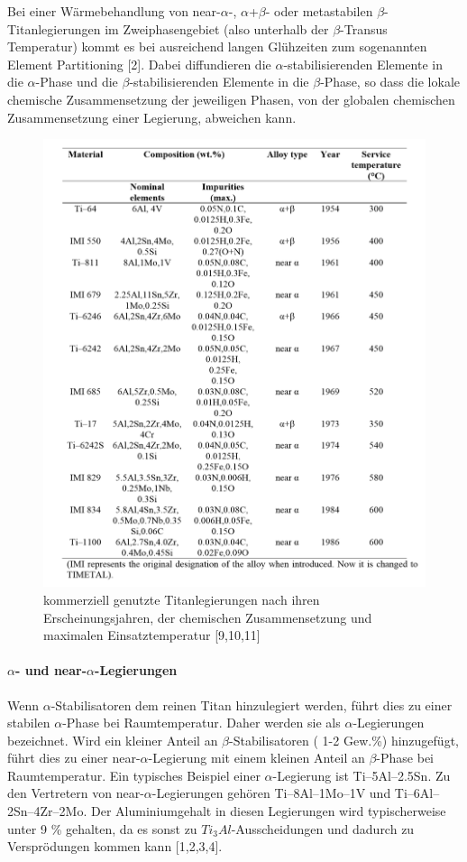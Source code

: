 Bei einer Wärmebehandlung von near-$\alpha$-, $\alpha$+$\beta$- oder metastabilen $\beta$-Titanlegierungen im Zweiphasengebiet (also unterhalb der $\beta$-Transus Temperatur) kommt es bei ausreichend langen Glühzeiten zum sogenannten Element Partitioning [2]. Dabei diffundieren die $\alpha$-stabilisierenden Elemente in die $\alpha$-Phase und die $\beta$-stabilisierenden Elemente in die $\beta$-Phase, so dass die lokale chemische Zusammensetzung der jeweiligen Phasen, von der globalen chemischen Zusammensetzung einer Legierung, abweichen kann.

\begin{figure}[h]
	\centering
	\includegraphics[width=0.8\linewidth]{"Bilder/Tabelle 2"}
	\caption[Tabelle 2]{kommerziell genutzte Titanlegierungen nach ihren Erscheinungsjahren, der chemischen Zusammensetzung und maximalen Einsatztemperatur [9,10,11]}
	\label{fig:tabelle-2}
\end{figure}

\paragraph{$\alpha$- und near-$\alpha$-Legierungen}
Wenn $\alpha$-Stabilisatoren dem reinen Titan hinzulegiert werden, führt dies zu einer stabilen $\alpha$-Phase bei Raumtemperatur. Daher werden sie als $\alpha$-Legierungen bezeichnet. Wird ein kleiner Anteil an $\beta$-Stabilisatoren ( 1-2 Gew.\%) hinzugefügt, führt dies zu einer near-$\alpha$-Legierung mit einem kleinen Anteil an $\beta$-Phase bei Raumtemperatur. Ein typisches Beispiel einer $\alpha$-Legierung ist Ti–5Al–2.5Sn. Zu den Vertretern von near-$\alpha$-Legierungen gehören Ti–8Al–1Mo–1V und Ti–6Al–2Sn–4Zr–2Mo. Der Aluminiumgehalt in diesen Legierungen wird typischerweise unter 9 \% gehalten, da es sonst zu $Ti_{3}Al$-Ausscheidungen und dadurch zu Versprödungen kommen kann [1,2,3,4].

